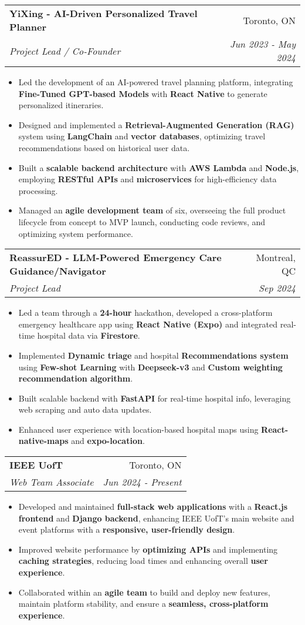 \documentclass[letterpaper,11pt]{article}
\makeatletter
\newcommand{\resumeItem}[1]{
  \item\small{
    {#1 \vspace{-5pt}}
  }
}
\newcommand{\resumeSubheading}[4]{
  \vspace{-2pt}\item
    \begin{tabular*}{0.97\textwidth}[t]{l@{\extracolsep{\fill}}r}
      \textbf{#1} & #2 \\
      \textit{\small#3} & \textit{\small #4} \\
    \end{tabular*}\vspace{-7pt}
}
\newcommand{\resumeItemListStart}{\begin{itemize}}
\newcommand{\resumeItemListEnd}{\end{itemize}\vspace{-5pt}}
\makeatother
\begin{document}
  \resumeSubheading
  {YiXing - AI-Driven Personalized Travel Planner}{Toronto, ON}
  {Project Lead / Co-Founder}{Jun 2023 - May 2024}
  \resumeItemListStart
      \resumeItem{Led the development of an AI-powered travel planning platform, integrating \textbf{Fine-Tuned GPT-based Models} with \textbf{React Native} to generate personalized itineraries.}
      \resumeItem{Designed and implemented a \textbf{Retrieval-Augmented Generation (RAG)} system using \textbf{LangChain} and \textbf{vector databases}, optimizing travel recommendations based on historical user data.}
      \resumeItem{Built a \textbf{scalable backend architecture} with \textbf{AWS Lambda} and \textbf{Node.js}, employing \textbf{RESTful APIs} and \textbf{microservices} for high-efficiency data processing.}
      \resumeItem{Managed an \textbf{agile development team} of six, overseeing the full product lifecycle from concept to MVP launch, conducting code reviews, and optimizing system performance.}
  \resumeItemListEnd


  \resumeSubheading
  {ReassurED - LLM-Powered Emergency Care Guidance/Navigator}{Montreal, QC}
  {Project Lead}{Sep 2024}
  \resumeItemListStart
    \resumeItem{Led a team through a \textbf{24-hour} hackathon, developed a cross-platform emergency healthcare app using \textbf{React Native (Expo)} and integrated real-time hospital data via \textbf{Firestore}.}
    \resumeItem{Implemented \textbf{Dynamic triage} and hospital \textbf{Recommendations system} using \textbf{Few-shot Learning} with \textbf{Deepseek-v3} and \textbf{Custom weighting recommendation algorithm}.}
    \resumeItem{Built scalable backend with \textbf{FastAPI} for real-time hospital info, leveraging web scraping and auto data updates.}
    \resumeItem{Enhanced user experience with location-based hospital maps using \textbf{React-native-maps} and \textbf{expo-location}.}
  \resumeItemListEnd

  
  \resumeSubheading
  {IEEE UofT}{Toronto, ON}
  {Web Team Associate}{Jun 2024 - Present}
  \resumeItemListStart
    \resumeItem{Developed and maintained \textbf{full-stack web applications} with a \textbf{React.js frontend} and \textbf{Django backend}, enhancing IEEE UofT's main website and event platforms with a \textbf{responsive, user-friendly design}.}
    \resumeItem{Improved website performance by \textbf{optimizing APIs} and implementing \textbf{caching strategies}, reducing load times and enhancing overall \textbf{user experience}.}
    \resumeItem{Collaborated within an \textbf{agile team} to build and deploy new features, maintain platform stability, and ensure a \textbf{seamless, cross-platform experience}.}
  \resumeItemListEnd
\end{document}

